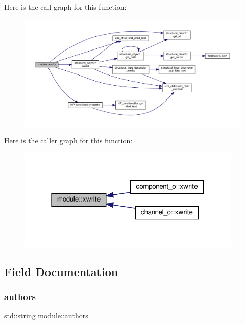 Here is the call graph for this function\+:
\nopagebreak
\begin{figure}[H]
\begin{center}
\leavevmode
\includegraphics[width=350pt]{d0/dd3/classmodule_acd60f65d5beaeed8a6728ea1cb506b74_cgraph}
\end{center}
\end{figure}
Here is the caller graph for this function\+:
\nopagebreak
\begin{figure}[H]
\begin{center}
\leavevmode
\includegraphics[width=303pt]{d0/dd3/classmodule_acd60f65d5beaeed8a6728ea1cb506b74_icgraph}
\end{center}
\end{figure}


\subsection{Field Documentation}
\mbox{\label{classmodule_ace978d8e371beb99e26663f72eed7875}} 
\subsubsection{\texorpdfstring{authors}{authors}}
{\footnotesize\ttfamily std\+::string module\+::authors\hspace{0.3cm}{\ttfamily [private]}}



